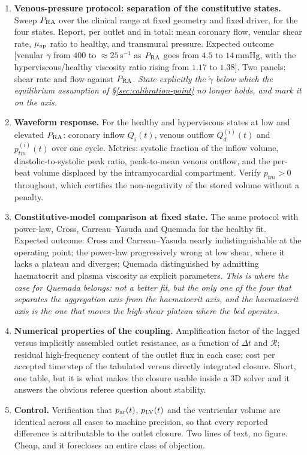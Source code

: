 \documentclass[lineno]{jfm}
\begin{document}
\begin{enumerate}
\item \textbf{Venous-pressure protocol: separation of the constitutive states.}
Sweep $P_{\rm RA}$ over the clinical range at fixed geometry and fixed driver,
for the four states. Report, per outlet and in total: mean coronary flow,
venular shear rate, $\mu_{\rm ap}$ ratio to healthy, and transmural pressure.
Expected outcome [venular $\dot{\gamma}$ from $400$ to
$\approx\!25\,\mathrm{s}^{-1}$ as $P_{\rm RA}$ goes from $4.5$ to
$14\,\mathrm{mmHg}$, with the hyperviscous/healthy viscosity ratio rising from
$1.17$ to $1.38$]. Two panels: shear rate and flow against $P_{\rm RA}$.
\emph{State explicitly the $\dot{\gamma}$ below which the equilibrium assumption
of \S\ref{sec:calibration-point} no longer holds, and mark it on the axis.}

\item \textbf{Waveform response.} For the healthy and hyperviscous states at
low and elevated $P_{\rm RA}$: coronary inflow $Q_i(t)$, venous outflow
$Q_d^{(i)}(t)$ and $p_{tm}^{(i)}(t)$ over one cycle. Metrics: systolic fraction
of the inflow volume, diastolic-to-systolic peak ratio, peak-to-mean venous
outflow, and the per-beat volume displaced by the intramyocardial compartment.
Verify $p_{tm}>0$ throughout, which certifies the non-negativity of the stored
volume without a penalty.

\item \textbf{Constitutive-model comparison at fixed state.} The same protocol
with power-law, Cross, Carreau--Yasuda and Quemada for the healthy fit. Expected
outcome: Cross and Carreau--Yasuda nearly indistinguishable at the operating
point; the power-law progressively wrong at low shear, where it lacks a plateau
and diverges; Quemada distinguished by admitting haematocrit and plasma viscosity
as explicit parameters. \emph{This is where the case for Quemada belongs: not a
better fit, but the only one of the four that separates the aggregation axis from
the haematocrit axis, and the haematocrit axis is the one that moves the
high-shear plateau where the bed operates.}

\item \textbf{Numerical properties of the coupling.} Amplification factor of the
lagged versus implicitly assembled outlet resistance, as a function of $\Delta t$
and $\mathcal{R}$; residual high-frequency content of the outlet flux in each
case; cost per accepted time step of the tabulated versus directly integrated
closure. Short, one table, but it is what makes the closure usable inside a 3D
solver and it answers the obvious referee question about stability.

\item \textbf{Control.} Verification that $p_{\rm ar}(t)$, $p_{\rm LV}(t)$ and
the ventricular volume are identical across all cases to machine precision, so
that every reported difference is attributable to the outlet closure. Two lines
of text, no figure. Cheap, and it forecloses an entire class of objection.

\end{enumerate}
\end{document}
